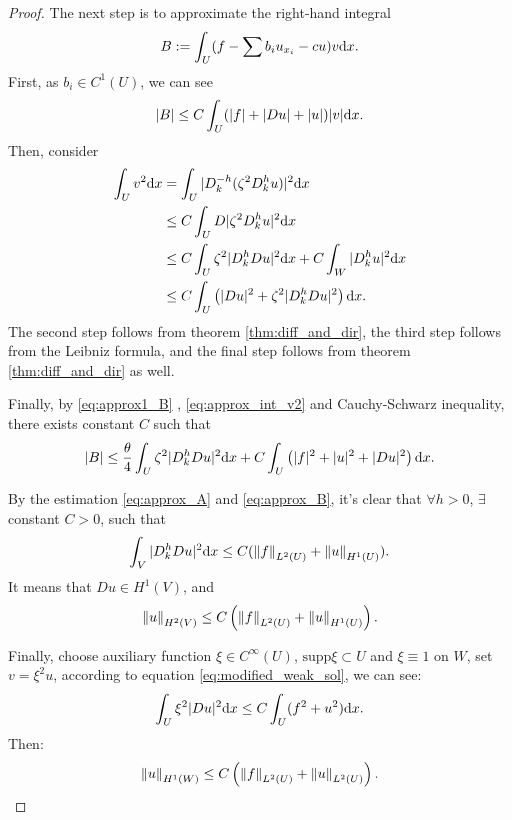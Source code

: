 \begin{proof}
    The next step is to approximate the right-hand integral 
    \begin{equation}
        \label{eq:integral_B}
        B:=\int_{U}(f-\sum b_{i}u_{x_{i}}-cu)v\mathrm{d} x.
    \end{equation}
    First, as $b_{i}\in C^{1}(U)$, we can see 
    \begin{equation}
        \label{eq:approx1_B}
        |B|\le C\int_{U}(|f|+|Du|+|u|)|v|\mathrm{d} x.
    \end{equation}
    Then, consider 
    \begin{equation}
        \label{eq:approx_int_v2}
        \begin{aligned}
            \int_{U}v^{2}\mathrm{d} x&=\int_{U}|D_{k}^{-h}(\zeta^{2}D_{k}^{h}u)|^{2}\mathrm{d} x\\
            &\le C\int_{U}D|\zeta^{2}D_{k}^{h}u|^{2}\mathrm{d} x\\
            &\le C\int_{U}\zeta^{2}|D_{k}^{h}Du|^{2}\mathrm{d} x+C\int_{W}|D_{k}^{h}u|^{2}\mathrm{d} x\\
            &\le C\int_{U}\left(|Du|^{2}+\zeta^{2}|D_{k}^{h}Du|^{2}\right)\mathrm{d} x.
        \end{aligned}
    \end{equation}
    The second step follows from theorem \ref{thm:diff_and_dir}, the third step follows from the Leibniz formula, and the final step follows from theorem \ref{thm:diff_and_dir} as well.
    
    Finally, by \eqref{eq:approx1_B} , \eqref{eq:approx_int_v2} and Cauchy-Schwarz inequality, there exists constant $C$ such that 
    \begin{equation}
        \label{eq:approx_B}
        |B|\le\frac{\theta}{4}\int_{U}\zeta^{2}|D_{k}^{h}Du|^{2}\mathrm{d} x+C\int_{U}\left(|f|^2+|u|^2+|Du|^2\right)\mathrm{d} x.
    \end{equation}
    
    By the estimation \eqref{eq:approx_A} and \eqref{eq:approx_B}, it's clear that $\forall h>0$, $\exists$ constant $C>0$, such that 
    \begin{equation}
        \int_{V}|D_{k}^{h}Du|^{2}\mathrm{d} x\le C(\left\|f\right\|_{L^{2}(U)}+\left\|u\right\|_{H^{1}(U)}).
    \end{equation}
    It means that $Du\in H^{1}(V)$, and 
    \begin{equation}
        \left\|u\right\|_{H^{2}(V)}\le C\left(\left\|f\right\|_{L^{2}(U)}+\left\|u\right\|_{H^{1}(U)}\right).
    \end{equation}

    Finally, choose auxiliary function $\xi\in C^{\infty}(U)$, $\text{supp}\xi\subset U$ and $\xi\equiv 1$ on $W$, set $v=\xi^{2}u$, according to equation \eqref{eq:modified_weak_sol}, we can see:
    \begin{equation}
        \int_{U}\xi^{2}|Du|^{2}\mathrm{d} x\le C\int_{U}(f^{2}+u^2)\mathrm{d} x.
    \end{equation}
    Then:
    \begin{equation}
        \left\|u\right\|_{H^{1}(W)}\le C\left(\left\|f\right\|_{L^{2}(U)}+\left\|u\right\|_{L^{2}(U)}\right).
    \end{equation}
\end{proof}
